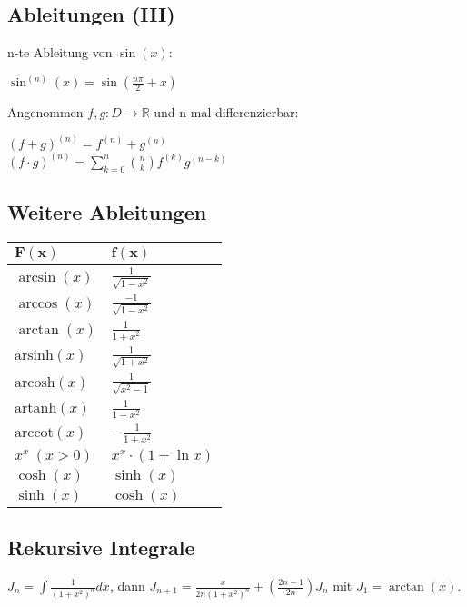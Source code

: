 \documentclass[a4paper,10pt]{article}
\def\R{\mathbb{R}}
\begin{document}
\subsection{Ableitungen (III)}
n-te Ableitung von $\sin(x)$:
\begin{center}
  $\sin^{(n)}(x) = \sin(\frac{n\pi}{2} + x)$
\end{center}

Angenommen $f,g: D\to \R$ und n-mal differenzierbar:
\begin{center}
  $(f+g)^{(n)} = f^{(n)} + g^{(n)}$\\
  $(f\cdot g)^{(n)} = \sum\limits_{k=0}^{n}\binom{n}{k}f^{(k)}g^{(n-k)}$ 
\end{center}

\subsection{Weitere Ableitungen}
\begin{center}
  \begin{tabularx}{\linewidth}{>{\centering\arraybackslash}X>{\centering\arraybackslash}X}
  \toprule
  $\mathbf{F(x)}$ & $\mathbf{f(x)}$ \\
  \midrule
  $\arcsin(x)$ & $\frac{1}{\sqrt{1 - x^2}}$ \\
  $\arccos(x)$ & $\frac{-1}{\sqrt{1 - x^2}}$ \\
  $\arctan(x)$ & $\frac{1}{1 + x^2}$ \\ 
  $\text{arsinh}(x)$ & $\frac{1}{\sqrt{1 + x^2}}$ \\
  $\text{arcosh}(x)$ & $\frac{1}{\sqrt{x^2 - 1}}$ \\
  $\text{artanh}(x)$ & $\frac{1}{1 - x^2}$ \\
  $\text{arccot}(x)$ & $-\frac{1}{1 + x^2}$ \\
  $x^x \ (x > 0)$ & $x^x \cdot (1 + \ln x)$ \\
  $\cosh(x)$ & $\sinh(x)$ \\
  $\sinh(x)$ & $\cosh(x)$ \\
  \bottomrule
  \end{tabularx}
\end{center}

\subsection{Rekursive Integrale}

$J_n = \int \frac{1}{(1 + x^2)^n} dx$, dann $J_{n+1} = \frac{x}{2n(1 + x^2)^n} + (\frac{2n - 1}{2n})J_n$ mit $J_1 = \arctan(x)$.
\end{document}
